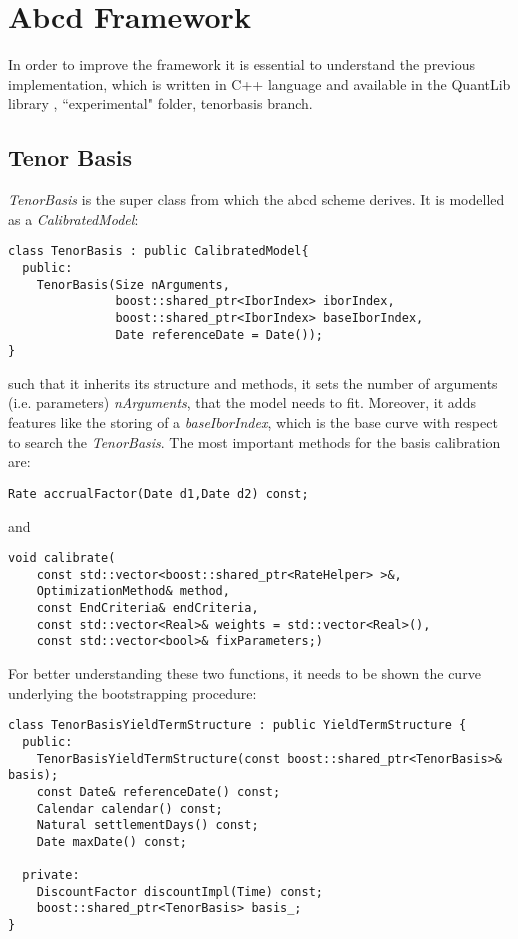 \chapter{Abcd Framework}
\label{chap:abcd_frame}
In order to improve the \cite{ametrano_ballabio_mazzocchi} framework it is essential to understand the previous implementation, which is written in C++ language and available in the QuantLib library \cite{quantlib_dev}, ``experimental" folder, tenorbasis branch.

\section{Tenor Basis}
\textit{TenorBasis} is the super class from which the abcd scheme derives. It is modelled as a \textit{CalibratedModel}:

\begin{lstlisting}
class TenorBasis : public CalibratedModel{
  public:
    TenorBasis(Size nArguments,
               boost::shared_ptr<IborIndex> iborIndex,
               boost::shared_ptr<IborIndex> baseIborIndex,
               Date referenceDate = Date());
}
\end{lstlisting} 

such that it inherits its structure and methods, it sets the number of arguments (i.e. parameters) \textit{nArguments}, that the model needs to fit. Moreover, it adds features like the storing of a \textit{baseIborIndex}, which is the base curve with respect to search the \textit{TenorBasis}.
The most important methods for the basis calibration are:

\begin{lstlisting}
Rate accrualFactor(Date d1,Date d2) const;
\end{lstlisting} 

and

\begin{lstlisting}
void calibrate(
    const std::vector<boost::shared_ptr<RateHelper> >&,
    OptimizationMethod& method,
    const EndCriteria& endCriteria,
    const std::vector<Real>& weights = std::vector<Real>(),
    const std::vector<bool>& fixParameters;)
\end{lstlisting} 

For better understanding these two functions, it needs to be shown the curve underlying the bootstrapping procedure:

\begin{lstlisting}
class TenorBasisYieldTermStructure : public YieldTermStructure {
  public:
    TenorBasisYieldTermStructure(const boost::shared_ptr<TenorBasis>& basis);
    const Date& referenceDate() const;
    Calendar calendar() const;
    Natural settlementDays() const;
    Date maxDate() const;
    
  private:
    DiscountFactor discountImpl(Time) const;
    boost::shared_ptr<TenorBasis> basis_;
}
\end{lstlisting} 

